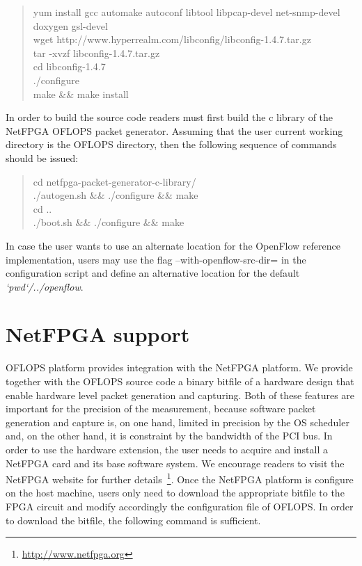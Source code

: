 \documentclass{book}
\begin{document}
\begin{quote}
    yum install gcc automake autoconf libtool libpcap-devel net-snmp-devel
    doxygen gsl-devel\\
    wget http://www.hyperrealm.com/libconfig/libconfig-1.4.7.tar.gz\\
    tar -xvzf libconfig-1.4.7.tar.gz \\
    cd libconfig-1.4.7 \\
    ./configure \\
    make \&\& make install 
\end{quote}

In order to build the source code readers must first build the c library of the
NetFPGA OFLOPS packet generator. Assuming that the user current working 
directory is the OFLOPS directory, then the following sequence of commands 
should be issued:

\begin{quote}
    cd netfpga-packet-generator-c-library/ \\
    ./autogen.sh \&\& ./configure \&\& make \\
    cd .. \\
    ./boot.sh \&\& ./configure \&\& make \\
\end{quote}

In case the user wants to use an alternate location for the OpenFlow reference
implementation, users may use the flag --with-openflow-src-dir= in the
configuration script and define an alternative location for the default
\emph{`pwd`/../openflow}. 

\section{NetFPGA support}

OFLOPS platform provides integration with the NetFPGA platform.
We provide together with the OFLOPS source code a binary bitfile of a hardware
design that enable hardware level packet generation and capturing. 
Both of these features are
important for the precision of the measurement, because software packet generation 
and capture is, on one hand, limited in 
precision by the OS scheduler and, on the other hand, it is constraint by the 
bandwidth of the PCI bus. In order to use the hardware extension, the
user needs to acquire and install a NetFPGA card and its base software system.
We encourage readers to visit the NetFPGA website for further
details~\footnote{\url{http://www.netfpga.org}}. Once the NetFPGA platform is
configure on the host machine, users only need to download the appropriate bitfile to the FPGA
circuit and modify accordingly the configuration file of OFLOPS. In order to
download the bitfile, the following command is sufficient. 
\end{document}
